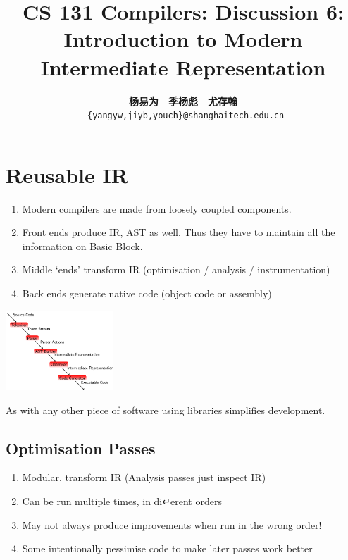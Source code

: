 \documentclass[a4paper]{article}
\title{CS 131 Compilers: Discussion 6: Introduction to Modern Intermediate Representation}
\author{\textbf{杨易为}~~\textbf{季杨彪}~~\textbf{尤存翰} \\ \texttt{ \{yangyw,jiyb,youch\}@shanghaitech.edu.cn}}
\theoremstyle{definition}
\begin{document}
\maketitle
\section{Reusable IR}
\begin{enumerate}
   \item Modern compilers are made from loosely coupled components. 
   \item Front ends produce IR, AST as well. Thus they have to maintain all the information on Basic Block.
   \item Middle ‘ends’ transform IR (optimisation / analysis / instrumentation)
   \item Back ends generate native code (object code or assembly)
 \end{enumerate}

 \begin{center}
  \includegraphics[height=3cm]{img/Snipaste_2021-04-05_17-18-11.png}
  \end{center}
  
  As with any other piece of software using libraries simplifies development.
  
  \subsection{Optimisation Passes}
  \begin{enumerate}
    \item  Modular, transform IR (Analysis passes just inspect IR)
    \item Can be run multiple times, in di↵erent orders
    \item May not always produce improvements when run in the wrong order!
    \item Some intentionally pessimise code to make later passes work better
  \end{enumerate}
  
\end{document}
